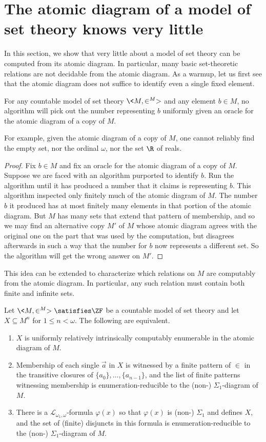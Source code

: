 \documentclass{amsart}
\newcommand{\avec}{\vec{a}}
\begin{document}
\section{The atomic diagram of a model of set theory knows very little}\label{Section.Atomic-diagram-knows-little}
In this section, we show that very little about a model of set theory can be computed from its atomic diagram. In particular, many basic set-theoretic relations are not decidable from the atomic diagram. As a warmup, let us first see that the atomic diagram does not suffice to identify even a single fixed element.
\begin{proposition}\label{Proposition.Atomic-diagram-knows-little}
For any countable model of set theory $\<M,\in^M>$ and any element $b\in M$, no algorithm will pick out the number representing $b$ uniformly given an oracle for the atomic diagram of a copy of $M$.
\end{proposition}
For example, given the atomic diagram of a copy of $M$, one cannot reliably find the empty set, nor the ordinal $\omega$, nor the set $\R$ of reals.
\begin{proof}
Fix $b\in M$ and fix an oracle for the atomic diagram of a copy of $M$. Suppose we are faced with an algorithm purported to identify $b$. Run the algorithm until it has produced a number that it claims is representing $b$. This algorithm inspected only finitely much of the atomic diagram of $M$. The number $b$ it produced has at most finitely many elements in that portion of the atomic diagram. But $M$ has many sets that extend that pattern of membership, and so we may find an alternative copy $M'$ of $M$ whose atomic diagram agrees with the original one on the part that was used by the computation, but disagrees afterwards in such a way that the number for $b$ now represents a different set. So the algorithm will get the wrong answer on $M'$.
\end{proof}
This idea can be extended to characterize which relations on $M$ are computably from the atomic diagram. In particular, any such relation must contain both finite and infinite sets.
\begin{theorem}\label{Theorem.Sets-known-by-atomic-diagram}
Let $\<M,\in^M>\satisfies\ZF$ be a countable model of set theory and let $X \subseteq M^n$ for $1 \le n < \omega$. The following are equivalent.
\begin{enumerate}
\item $X$ is uniformly
relatively intrinsically computably enumerable in the atomic diagram of $M$.
\item Membership of each single $\avec$ in $X$ is witnessed by a finite pattern of $\in$ in the transitive closures of $\{a_0\}, \ldots, \{a_{n-1}\}$, and the list of finite patterns witnessing membership is enumeration-reducible
to the (non-\Levy) $\Sigma_1$-diagram of $M$.
\item There is a $\mathcal{L}_{\omega_1,\omega}$-formula $\varphi(x)$ so that $\varphi(x)$ is (non-\Levy) $\Sigma_1$ and defines $X$, and the set of (finite) disjuncts in this formula is enumeration-reducible to the (non-\Levy) $\Sigma_1$-diagram of $M$.
\end{enumerate}
\end{theorem}
\end{document}
